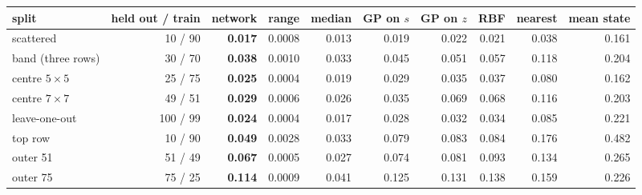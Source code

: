 \begin{tabular}{lrrrrrrrrr}
\toprule
split & held out / train & network & range & median & GP on $s$ & GP on $z$ & RBF & nearest & mean state \\
\midrule
scattered & 10 / 90 & \textbf{0.017} & 0.0008 & 0.013 & 0.019 & 0.022 & 0.021 & 0.038 & 0.161 \\
band (three rows) & 30 / 70 & \textbf{0.038} & 0.0010 & 0.033 & 0.045 & 0.051 & 0.057 & 0.118 & 0.204 \\
centre $5\times5$ & 25 / 75 & \textbf{0.025} & 0.0004 & 0.019 & 0.029 & 0.035 & 0.037 & 0.080 & 0.162 \\
centre $7\times7$ & 49 / 51 & \textbf{0.029} & 0.0006 & 0.026 & 0.035 & 0.069 & 0.068 & 0.116 & 0.203 \\
leave-one-out & 100 / 99 & \textbf{0.024} & 0.0004 & 0.017 & 0.028 & 0.032 & 0.034 & 0.085 & 0.221 \\
\midrule
top row & 10 / 90 & \textbf{0.049} & 0.0028 & 0.033 & 0.079 & 0.083 & 0.084 & 0.176 & 0.482 \\
outer 51 & 51 / 49 & \textbf{0.067} & 0.0005 & 0.027 & 0.074 & 0.081 & 0.093 & 0.134 & 0.265 \\
outer 75 & 75 / 25 & \textbf{0.114} & 0.0009 & 0.041 & 0.125 & 0.131 & 0.138 & 0.159 & 0.226 \\
\bottomrule
\end{tabular}
